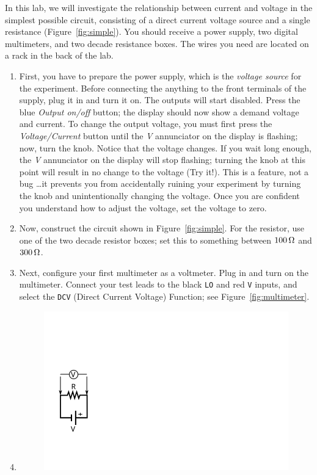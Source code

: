 \documentclass[12pt]{article}
\begin{document}
In this lab, we will investigate the relationship between current and
voltage in the simplest possible circuit, consisting of a direct
current voltage source and a single resistance
(Figure~\ref{fig:simple}).  You should receive a power supply, two
digital multimeters, and two decade resistance boxes.  The wires you
need are located on a rack in the back of the lab.
\begin{enumerate}
\item First, you have to prepare the power supply, which is the
  \textit{voltage source} for the experiment.  Before connecting the
  anything to the front terminals of the supply, plug it in and turn
  it on.  The outputs will start disabled.  Press the blue
  \textit{Output on/off} button; the display should now show a demand
  voltage and current.  To change the output voltage, you must first
  press the \textit{Voltage/Current} button until the \textit{V}
  annunciator on the display is flashing; now, turn the knob.  Notice
  that the voltage changes.  If you wait long enough, the \textit{V}
  annunciator on the display will stop flashing; turning the knob at
  this point will result in no change to the voltage (Try it!).  This
  is a feature, not a bug \ldots it prevents you from accidentally
  ruining your experiment by turning the knob and unintentionally
  changing the voltage.  Once you are confident you understand how to
  adjust the voltage, set the voltage to zero.
\item Now, construct the circuit shown in Figure~\ref{fig:simple}.
  For the resistor, use one of the two decade resistor boxes; set this
  to something between $\unit[100]{\Omega}$ and $\unit[300]{\Omega}$.
\item Next, configure your first multimeter as a voltmeter.  Plug in
  and turn on the multimeter.  Connect your test leads to the black
  \texttt{LO} and red \texttt{V} inputs, and select the \texttt{DCV}
  (Direct Current Voltage) Function; see Figure~\ref{fig:multimeter}.
\item 
  \begin{figure}
    \centering
    \includegraphics[width=\textwidth/5]{figures/simplest_with_voltmeter}

\end{figure}
\end{enumerate}
\end{document}
